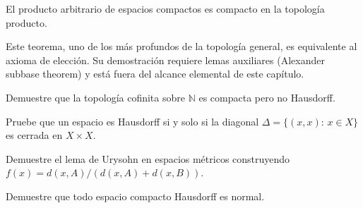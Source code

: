 \begin{theorem}[Tychonoff]
\label{teo:tychonoff}
El producto arbitrario de espacios compactos es compacto en la topología producto.
\end{theorem}

Este teorema, uno de los más profundos de la topología general, es equivalente al axioma de elección. Su demostración requiere lemas auxiliares (Alexander subbase theorem) y está fuera del alcance elemental de este capítulo.

\begin{exercise}
Demuestre que la topología cofinita sobre $\mathbb{N}$ es compacta pero no Hausdorff.
\end{exercise}

\begin{exercise}
Pruebe que un espacio es Hausdorff si y solo si la diagonal $\Delta=\{(x,x):\,x\in X\}$ es cerrada en $X\times X$.
\end{exercise}

\begin{exercise}
Demuestre el lema de Urysohn en espacios métricos construyendo $f(x)=d(x,A)/(d(x,A)+d(x,B))$.
\end{exercise}

\begin{problem}
Demuestre que todo espacio compacto Hausdorff es normal.
\end{problem}

